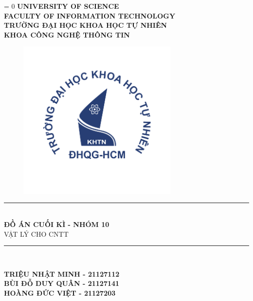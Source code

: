 \documentclass{report}
\def\lang{1} %
\begin{document}
\begin{titlepage}



\begin{center}
\ifnum\lang = 0
    \textbf{\Large UNIVERSITY OF SCIENCE}\\[0.2cm]
    \textbf{\Large FACULTY OF INFORMATION TECHNOLOGY}\\
\else
    \textbf{\Large TRƯỜNG ĐẠI HỌC KHOA HỌC TỰ NHIÊN}\\
    \textbf{\Large KHOA CÔNG NGHỆ THÔNG TIN}\\
\fi

\begin{figure}[!h]
    \centering
    \includegraphics[width=8cm, height=8cm]{img/KHTN.png}
\end{figure}

\rule{\textwidth}{1pt} \\[0.4cm]
{\huge \bfseries ĐỒ ÁN CUỐI KÌ - NHÓM 10}\\[0.4cm]
\textsc{\Large VẬT LÝ CHO CNTT}
\rule{\textwidth}{1pt} \\[1cm]

\begin{center}
    \textbf{\Large TRIỆU NHẬT MINH - 21127112}\\
    \textbf{\Large BÙI ĐỖ DUY QUÂN - 21127141}\\
    \textbf{\Large HOÀNG ĐỨC VIỆT - 21127203}\\[3cm]
\end{center}


\end{center}
\end{titlepage}
\end{document}
